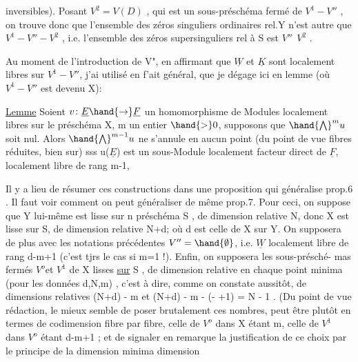 
inversibles). Posant $V^2 = V(D)$ , qui est un sous-préschéma fermé de
$V^1-V''$ , on trouve donc que l'ensemble des  zéros singuliers
ordinaires rel.Y n'est autre que $V^1 - V'' - V^2$ , i.e. l'ensemble des
zéros supersinguliers  rel à S est $V''\ \ V^2$ .

\placedmargin{$\|$} Au moment de l'introduction de V", en affirmant que $\underline{W}$ et $\underline{K}$ sont
localement libres sur $V^1-V''$, j'ai utilisé en f'ait général, que je dégage
ici en lemme (où $V^1-V''$ est devenu X):

\uline{Lemme} Soient $v\colon \underline{E} \hand{\to} \underline{F}$ un homomorphisme de Modules localement libres
sur le préschéma X,  m un entier $\hand{>}0$, supposons que $\hand{\bigwedge}^{m} u$ soit
nul.  Alors
$\hand{\bigwedge}^{m-1} u$ ne s'annule en aucun point (du point de vue fibres réduites, bien
sur)  sss u($\underline{E}$) est un sous-Module localement facteur direct de $\underline{F}$,
localement libre de rang m-1, 

Il y a lieu de résumer ces constructions dans une proposition
qui généralise prop.6 . Il faut voir comment on peut généraliser de même
prop.7. Pour ceci, on suppose que Y lui-même est lisse sur n préschéma
S , de dimension relative N, donc X est lisse sur S, de dimension relative N+d\unsure{$^{\ast}$}; où d est celle de X
sur Y. On supposera de plus avec les notations précédentes $V''=\hand{\emptyset}$, i.e.
$\underline{W}$ localement libre de rang d-m+1 (c'est tjrs le cas si m=1 !). Enfin, on supposera les sous-présché-%
mas fermés  $V^o$et $V^1$ de X lisses \uline{sur} S , de dimension relative  en chaque
point minima (pour les données d,N,m) ,  c'est à dire, comme
on constate aussitôt, de dimensions relatives (N+d) - m et
(N+d) - m - (- +1) = N - 1 . (Du point de vue rédaction, le mieux
semble de poser brutalement ces nombres, peut être plutôt en termes
de codimension fibre par fibre, celle de $V^o$ dans X étant m, celle de
$V^1$ dans $V^o$ étant d-m+1 ; et de signaler en remarque la justification
de ce choix par le principe de la dimension minima  dimension 

